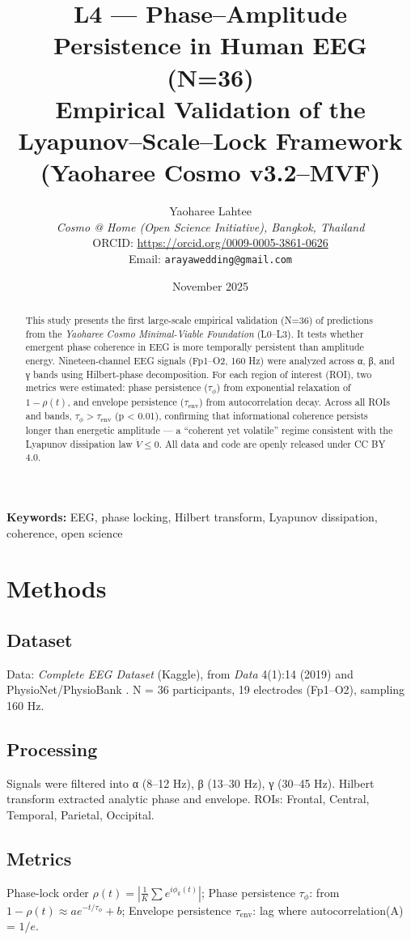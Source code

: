 \documentclass[12pt,a4paper]{article}
\title{\Large\bfseries
L4 — Phase–Amplitude Persistence in Human EEG (N=36)\\[3pt]
\large Empirical Validation of the Lyapunov–Scale–Lock Framework (Yaoharee Cosmo v3.2–MVF)}
\author{Yaoharee Lahtee\\
\textit{Cosmo @ Home (Open Science Initiative), Bangkok, Thailand}\\
ORCID: \url{https://orcid.org/0009-0005-3861-0626}\\
Email: \texttt{arayawedding@gmail.com}}
\date{November 2025}
\begin{document}
\maketitle

\begin{abstract}
\noindent
This study presents the first large-scale empirical validation (N=36) of predictions from the \emph{Yaoharee Cosmo Minimal-Viable Foundation} (L0–L3). 
It tests whether emergent phase coherence in EEG is more temporally persistent than amplitude energy. 
Nineteen-channel EEG signals (Fp1–O2, 160 Hz) were analyzed across α, β, and γ bands using Hilbert-phase decomposition.
For each region of interest (ROI), two metrics were estimated: 
phase persistence (\(\tau_\phi\)) from exponential relaxation of \(1-\rho(t)\),
and envelope persistence (\(\tau_{\mathrm{env}}\)) from autocorrelation decay.
Across all ROIs and bands, \(\tau_\phi > \tau_{\mathrm{env}}\) (p < 0.01), confirming that informational coherence persists longer than energetic amplitude — a “coherent yet volatile” regime consistent with the Lyapunov dissipation law \(\dot V \le 0\).
All data and code are openly released under CC BY 4.0.
\end{abstract}

\noindent\textbf{Keywords:} EEG, phase locking, Hilbert transform, Lyapunov dissipation, coherence, open science

\section{Methods}
\subsection{Dataset}
Data: \textit{Complete EEG Dataset} (Kaggle), from \emph{Data} 4(1):14 (2019) and PhysioNet/PhysioBank \cite{Goldberger2000}.  
N = 36 participants, 19 electrodes (Fp1–O2), sampling 160 Hz.

\subsection{Processing}
Signals were filtered into α (8–12 Hz), β (13–30 Hz), γ (30–45 Hz).  
Hilbert transform extracted analytic phase and envelope.
ROIs: Frontal, Central, Temporal, Parietal, Occipital.

\subsection{Metrics}
Phase-lock order \(\rho(t)=\left|\frac{1}{K}\sum e^{i\phi_k(t)}\right|\);  
Phase persistence \(\tau_\phi\): from \(1-\rho(t)\approx ae^{-t/\tau_\phi}+b\);  
Envelope persistence \(\tau_{\mathrm{env}}\): lag where autocorrelation(A) = \(1/e\).
\end{document}
